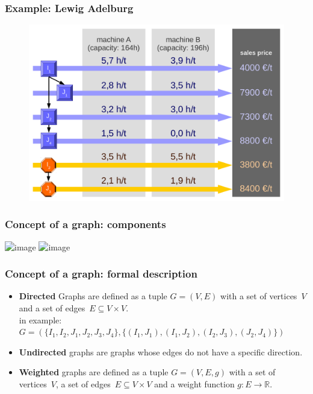 
\begin{frame}
 \frametitle{Example: Lewig Adelburg}
 \begin{figure}
  \centering
  \includegraphics[width=\linewidth]{Bilder/LewigAdelburg}
 \end{figure}
\end{frame}

\begin{frame}
 \frametitle{Concept of a graph: components}
 \begin{center}
  \includegraphics<1>[width=.7\linewidth,page=1]{Bilder/Graph_Lewig_Adelburg}
  \includegraphics<2>[width=.7\linewidth,page=2]{Bilder/Graph_Lewig_Adelburg}
 \end{center}
\end{frame}

\begin{frame}
 \frametitle{Concept of a graph: formal description}
 \begin{itemize}
  \item \textbf{Directed} Graphs are defined as a tuple $G=(V, E)$ with a set of vertices~$V$ and a set of edges~$E\subseteq V\times V$.\\[1ex]
    in example:\\{\footnotesize $G = (\{I_1, I_2, J_1, J_2, J_3, J_4\}, \{(I_1, J_1), (I_1, J_2), (I_2, J_3), (J_2, J_4)\})$}
  \item \textbf{Undirected} graphs are graphs whose edges do not have a specific direction.
  \item \textbf{Weighted} graphs are defined as a tuple $G=(V, E, g)$ with a set of vertices~$V$, a set of edges~$E\subseteq V\times V$ and a weight function $g:E\rightarrow\mathbb{R}$.
 \end{itemize}
\end{frame}
